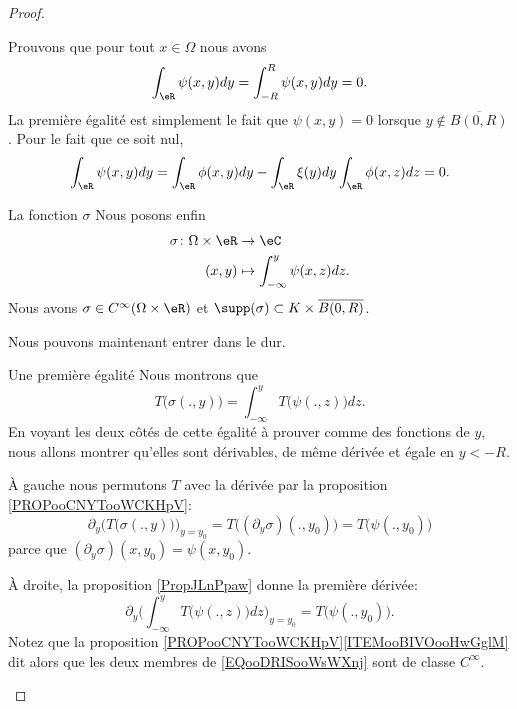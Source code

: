 \begin{proof}
\begin{subproof}
\begin{subproof}
        Prouvons que pour tout \( x\in \Omega\) nous avons
        \begin{equation}
            \int_{\eR}\psi(x,y)dy=\int_{-R}^R\psi(x,y)dy=0.
        \end{equation}
        La première égalité est simplement le fait que \( \psi(x,y)=0\) lorsque \( y\notin \overline{ B(0,R) }\). Pour le fait que ce soit nul,
        \begin{equation}
            \int_{\eR}\psi(x,y)dy=\int_{\eR}\phi(x,y)dy-\int_{\eR}\xi(y)dy\int_{\eR}\phi(x,z)dz=0.
        \end{equation}
        
    \item[La fonction \( \sigma\)]
        Nous posons enfin
        \begin{equation}
            \begin{aligned}
                \sigma\colon \Omega\times \eR&\to \eC \\
                (x,y)&\mapsto \int_{-\infty}^y\psi(x,z)dz. 
            \end{aligned}
        \end{equation}
        Nous avons \( \sigma\in C^{\infty}(\Omega\times \eR)\) et \( \supp(\sigma)\subset K\times \overline{ B(0,R) }\).
        \end{subproof}
       Nous pouvons maintenant entrer dans le dur. 

       \begin{subproof}
        \item[Une première égalité]
           Nous montrons que
           \begin{equation}     \label{EQooDRISooWsWXnj}
               T\big( \sigma(.,y) \big)=\int_{-\infty}^yT\big( \psi(.,z) \big)dz.
           \end{equation}
           En voyant les deux côtés de cette égalité à prouver comme des fonctions de \( y\), nous allons montrer qu'elles sont dérivables, de même dérivée et égale en \( y<-R\).

           À gauche nous permutons \( T\) avec la dérivée par la proposition \ref{PROPooCNYTooWCKHpV}:
           \begin{equation}
               \partial_y\big( T\big( \sigma(.,y) \big) \big)_{y=y_0}=T\big( (\partial_y\sigma)(.,y_0) \big)=T\big( \psi(.,y_0) \big)
           \end{equation}
           parce que \( (\partial_y\sigma)(x,y_0)=\psi(x,y_0)\). 

           À droite, la proposition \ref{PropJLnPpaw} donne la première dérivée:
           \begin{equation}
               \partial_y\big( \int_{-\infty}^yT\big( \psi(.,z) \big)dz \big)_{y=y_0}=T\big( \psi(.,y_0) \big).
           \end{equation}
           Notez que la proposition \ref{PROPooCNYTooWCKHpV}\ref{ITEMooBIVOooHwGglM} dit alors que les deux membres de \eqref{EQooDRISooWsWXnj} sont de classe \(  C^{\infty}\).


\end{subproof}
\end{subproof}
\end{proof}

